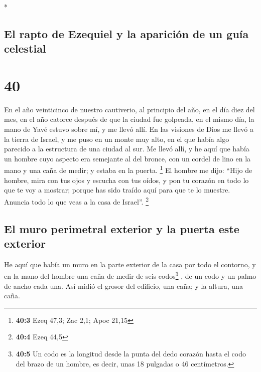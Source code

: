 \begin{paracol}{2}
\begin{otherlanguage}{english}
\end{otherlanguage}

\switchcolumn[0]*

\hypertarget{el-rapto-de-ezequiel-y-la-apariciuxf3n-de-un-guuxeda-celestial}{%
\subsection{El rapto de Ezequiel y la aparición de un guía
celestial}\label{el-rapto-de-ezequiel-y-la-apariciuxf3n-de-un-guuxeda-celestial}}

\hypertarget{section-78}{%
\section{40}\label{section-78}}

 En el año veinticinco de nuestro cautiverio, al principio
del año, en el día diez del mes, en el año catorce después de que la
ciudad fue golpeada, en el mismo día, la mano de Yavé estuvo sobre mí, y
me llevó allí.  En las visiones de Dios me llevó a la
tierra de Israel, y me puso en un monte muy alto, en el que había algo
parecido a la estructura de una ciudad al sur.  Me llevó
allí, y he aquí que había un hombre cuyo aspecto era semejante al del
bronce, con un cordel de lino en la mano y una caña de medir; y estaba
en la puerta. \footnote{\textbf{40:3} Ezeq 47,3; Zac 2,1; Apoc 21,15}
 El hombre me dijo: ``Hijo de hombre, mira con tus ojos y
escucha con tus oídos, y pon tu corazón en todo lo que te voy a mostrar;
porque has sido traído aquí para que te lo muestre. Anuncia todo lo que
veas a la casa de Israel''. \footnote{\textbf{40:4} Ezeq 44,5}

\hypertarget{el-muro-perimetral-exterior-y-la-puerta-este-exterior}{%
\subsection{El muro perimetral exterior y la puerta este
exterior}\label{el-muro-perimetral-exterior-y-la-puerta-este-exterior}}

 He aquí que había un muro en la parte exterior de la casa
por todo el contorno, y en la mano del hombre una caña de medir de seis
codos\footnote{\textbf{40:5} Un codo es la longitud desde la punta del
  dedo corazón hasta el codo del brazo de un hombre, es decir, unas 18
  pulgadas o 46 centímetros.} , de un codo y un palmo de ancho cada una.
Así midió el grosor del edificio, una caña; y la altura, una caña.


\end{paracol}

